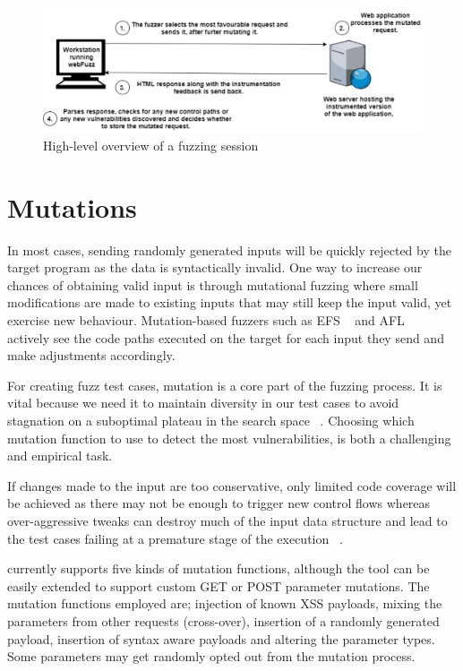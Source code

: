 \begin{figure}[ht]
 \centering
 \captionsetup{justification=centering}
 \includegraphics[width=\linewidth]{figures/architecture.pdf}
 \caption{High-level overview of a \pname{} fuzzing session}
 \label{fig:architecture}
\end{figure}

\section{Mutations}
In most cases, sending randomly generated inputs will be quickly rejected by the target program as the data is syntactically invalid. One way to increase our chances of obtaining valid input is through mutational fuzzing where small modifications are made to existing inputs that may still keep the input valid, yet exercise new behaviour. Mutation-based fuzzers such as EFS ~\cite{efs2007} and AFL ~\cite{zalewski2015american} actively see the code paths executed on the target for each input they send and make adjustments accordingly. 

For creating fuzz test cases, mutation is a core part of the fuzzing process. It is vital because we need it to maintain diversity in our test cases to avoid stagnation on a suboptimal plateau in the search space ~\cite{seal2016Genetic}. Choosing which mutation function to use to detect the most vulnerabilities, is both a challenging and empirical task. 

If changes made to the input are too conservative, only limited code coverage will be achieved as there may not be enough to trigger new control flows whereas over-aggressive tweaks can destroy much of the input data structure and lead to the test cases failing at a premature stage of the execution ~\cite{zalewski2014Mutations}.

\pname{} currently supports five kinds of mutation functions, although the tool can be easily
extended to support custom GET or POST parameter mutations. The mutation functions employed are; injection of known XSS payloads, mixing the parameters from other requests (cross-over), insertion of a randomly generated payload, insertion of syntax aware payloads and altering the
parameter types. Some parameters may get randomly opted out from the mutation process. 


